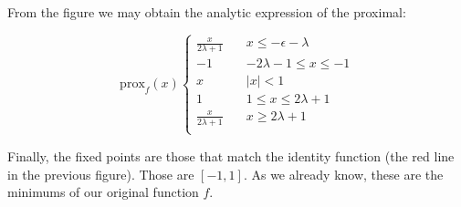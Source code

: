 \documentclass[11pt,table]{article}
\begin{document}
	From the figure we may obtain the analytic expression of the proximal:
	
	\[
	\text{prox}_f(x) \begin{cases}
		\frac{x}{2\lambda + 1} \quad & x \le -\epsilon-\lambda \\
		-1 \quad &  -2\lambda-1 \le x \le -1 \\
		x \quad & |x| < 1 \\
		1 \quad & 1 \le x \le 2\lambda + 1 \\
		\frac{x}{2\lambda + 1} \quad & x \ge 2\lambda + 1 \\
	\end{cases}
	\]
	
	Finally, the fixed points are those that match the identity function (the red line in the previous figure). Those are $[-1,1]$. As we already know, these are the minimums of our original function $f$.
	
\end{document}
